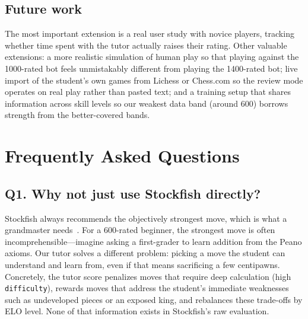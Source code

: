 \documentclass[11pt]{article}
\begin{document}
\subsection*{Future work}
The most important extension is a real user study with novice players, tracking whether time spent with the tutor actually raises their rating. Other valuable extensions: a more realistic simulation of human play so that playing against the 1000-rated bot feels unmistakably different from playing the 1400-rated bot; live import of the student's own games from Lichess or Chess.com so the review mode operates on real play rather than pasted text; and a training setup that shares information across skill levels so our weakest data band (around 600) borrows strength from the better-covered bands.

\newpage

\section*{Frequently Asked Questions}

\subsection*{Q1. Why not just use Stockfish directly?}
Stockfish always recommends the objectively strongest move, which is what a grandmaster needs~\cite{silver2018alphazero}. For a 600-rated beginner, the strongest move is often incomprehensible---imagine asking a first-grader to learn addition from the Peano axioms. Our tutor solves a different problem: picking a move the student can understand and learn from, even if that means sacrificing a few centipawns. Concretely, the tutor score penalizes moves that require deep calculation (high \texttt{difficulty}), rewards moves that address the student's immediate weaknesses such as undeveloped pieces or an exposed king, and rebalances these trade-offs by ELO level. None of that information exists in Stockfish's raw evaluation.
\end{document}
